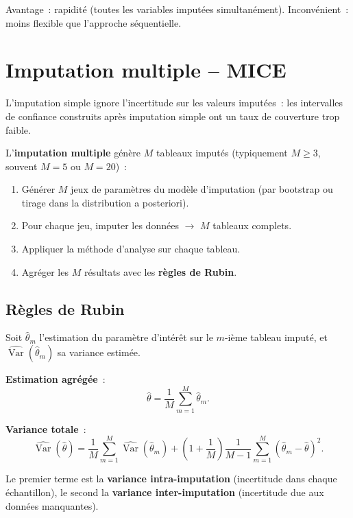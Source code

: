 \documentclass[a4paper,11pt]{article}
\theoremstyle{definition}
\theoremstyle{remark}
\begin{document}
Avantage~: rapidité (toutes les variables imputées simultanément).
Inconvénient~: moins flexible que l'approche séquentielle.

\section{Imputation multiple -- MICE}

L'imputation simple ignore l'incertitude sur les valeurs imputées~:
les intervalles de confiance construits après imputation simple ont un
taux de couverture trop faible.

L'\textbf{imputation multiple} génère $M$ tableaux imputés (typiquement
$M \ge 3$, souvent $M=5$ ou $M=20$)~:

\begin{enumerate}
  \item Générer $M$ jeux de paramètres du modèle d'imputation (par
    bootstrap ou tirage dans la distribution a posteriori).
  \item Pour chaque jeu, imputer les données $\rightarrow$ $M$ tableaux
    complets.
  \item Appliquer la méthode d'analyse sur chaque tableau.
  \item Agréger les $M$ résultats avec les \textbf{règles de Rubin}.
\end{enumerate}

\subsection{Règles de Rubin}

Soit $\hat{\theta}_m$ l'estimation du paramètre d'intérêt sur le
$m$-ième tableau imputé, et $\widehat{\operatorname{Var}}(\hat{\theta}_m)$
sa variance estimée.

\textbf{Estimation agrégée}~:
\[
\hat{\theta} = \frac{1}{M}\sum_{m=1}^{M} \hat{\theta}_m.
\]

\textbf{Variance totale}~:
\[
\widehat{\operatorname{Var}}(\hat{\theta})
= \frac{1}{M}\sum_{m=1}^{M} \widehat{\operatorname{Var}}(\hat{\theta}_m)
+ \left(1 + \frac{1}{M}\right)
  \frac{1}{M-1}\sum_{m=1}^{M} (\hat{\theta}_m - \hat{\theta})^2.
\]

Le premier terme est la \textbf{variance intra-imputation} (incertitude
dans chaque échantillon), le second la \textbf{variance inter-imputation}
(incertitude due aux données manquantes).
\end{document}
